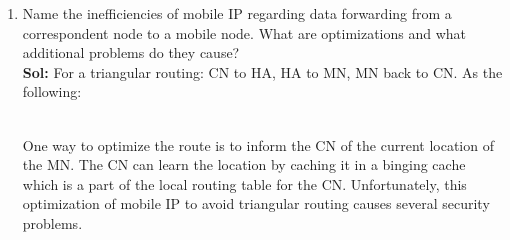 \documentclass[11pt]{article}
\begin{document}
\begin{enumerate}
\item Name the inefficiencies of mobile IP regarding data forwarding from a correspondent node to a mobile node. What are optimizations and what additional problems do they cause?\\
\textbf{Sol:} For a triangular routing: CN to HA, HA to MN, MN back to CN. As the following:\\
\\
One way to optimize the route is to inform the CN of the current location of the MN. The CN can learn the location by caching it in a binging cache which is a part of the local routing table for the CN. Unfortunately, this optimization of mobile IP to avoid triangular routing causes several security problems.
\end{enumerate}
\end{document}
